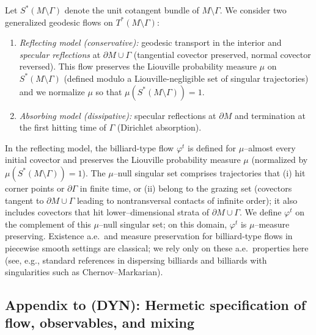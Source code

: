 \begin{hypothesis}\label{hyp:mixing}
Let $S^*(M\setminus\Gamma)$ denote the unit cotangent bundle of $M\setminus\Gamma$.
We consider two generalized geodesic flows on $T^*(M\setminus\Gamma)$:
\begin{enumerate}
  \item \emph{Reflecting model (conservative):} geodesic transport in the interior and \emph{specular reflections} at $\partial M\cup\Gamma$ (tangential covector preserved, normal covector reversed).
  This flow preserves the Liouville probability measure $\mu$ on $S^*(M\setminus\Gamma)$ (defined modulo a Liouville-negligible set of singular trajectories) and we normalize $\mu$ so that $\mu(S^*(M\setminus\Gamma))=1$.
  \item \emph{Absorbing model (dissipative):} specular reflections at $\partial M$ and termination at the first hitting time of $\Gamma$ (Dirichlet absorption).
\end{enumerate}
In the reflecting model, the billiard-type flow $\varphi^t$ is defined for $\mu$–almost every initial covector and preserves the Liouville probability measure $\mu$ (normalized by $\mu(S^*(M\setminus\Gamma))=1$).
The $\mu$–null singular set comprises trajectories that (i) hit corner points or $\partial\Gamma$ in finite time, or (ii) belong to the grazing set (covectors tangent to $\partial M\cup\Gamma$ leading to nontransversal contacts of infinite order); it also includes covectors that hit lower–dimensional strata of $\partial M\cup\Gamma$.
We define $\varphi^t$ on the complement of this $\mu$–null singular set; on this domain, $\varphi^t$ is $\mu$–measure preserving.
Existence a.e.\ and measure preservation for billiard-type flows in piecewise smooth settings are classical; we rely only on these a.e.\ properties here (see, e.g., standard references in dispersing billiards and billiards with singularities such as Chernov–Markarian).



\subsection*{Appendix to (DYN): Hermetic specification of flow, observables, and mixing}


\end{hypothesis}

